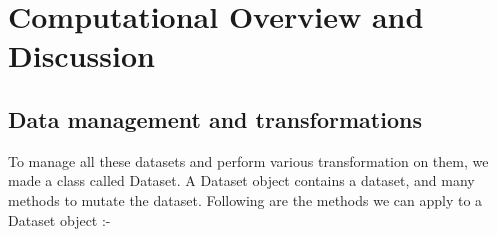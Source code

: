 \documentclass[a4paper, 11pt]{report}
\begin{document}
\newpage

\chapter{Computational Overview and Discussion}

\section{Data management and transformations}

 To manage all these datasets and perform various transformation on them, we made a class called Dataset. A Dataset object contains a dataset, and many methods to mutate the dataset. Following are the methods we can apply to a Dataset object :- \\
\end{document}
